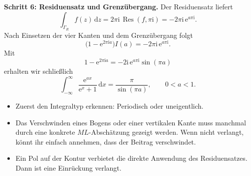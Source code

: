 \documentclass[11pt,a4paper]{article}
\newcommand{\ii}{\mathrm i}
\newcommand{\ee}{\mathrm e}
\newcommand{\dd}{\,\mathrm d}
\newcommand{\Res}{\operatorname{Res}}
\newcommand{\1}{\mathbf 1}
\begin{document}
{\begin{beispielbox}[title={Vorgerechnetes Prüfungsbeispiel: Aufgabe 12 (2025) -- uneigentliches Integral mit Rechteckkontur}]
\textbf{Schritt 6: Residuensatz und Grenzübergang.}
Der Residuensatz liefert
\[
\int_{\Gamma_R}f(z)\dd z
=2\pi\ii\,\Res(f,\pi\ii)
=-2\pi\ii\,\ee^{a\pi\ii}.
\]
Nach Einsetzen der vier Kanten und dem Grenzübergang folgt
\[
\bigl(1-\ee^{2\pi\ii a}\bigr)I(a)
=-2\pi\ii\,\ee^{a\pi\ii}.
\]
Mit
\[
1-\ee^{2\pi\ii a}
=-2\ii\,\ee^{a\pi\ii}\sin(\pi a)
\]
erhalten wir schließlich
\[
\boxed{
\int_{-\infty}^{\infty}\frac{\ee^{ax}}{\ee^x+1}\dd x
=\frac{\pi}{\sin(\pi a)},\qquad 0<a<1.
}
\]
\end{beispielbox}

\begin{pruefungsbox}[title=Prüfungsblick: große Residuenaufgabe]
\begin{itemize}
\item Zuerst den Integraltyp erkennen: Periodisch oder uneigentlich.
\item Das Verschwinden eines Bogens oder einer vertikalen Kante muss manchmal durch eine
konkrete $ML$-Abschätzung gezeigt werden. Wenn nicht verlangt, könnt ihr einfach annehmen, dass der Beitrag verschwindet.
\item Ein Pol auf der Kontur verbietet die direkte Anwendung des Residuensatzes.
Dann ist eine Einrückung verlangt.
\end{itemize}
\end{pruefungsbox}
}
\end{document}
